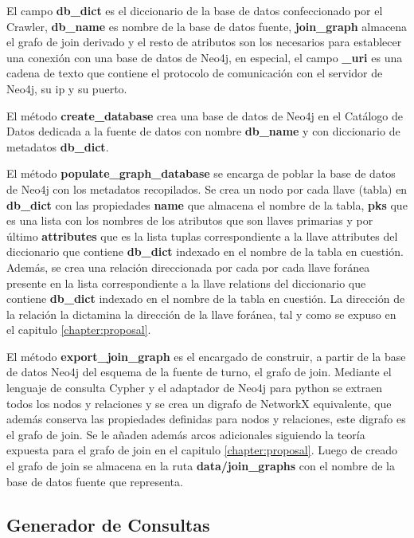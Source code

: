 El campo \textbf{db\_dict} es el diccionario de la base de datos confeccionado por el Crawler, \textbf{db\_name} es 
nombre de la base de datos fuente, \textbf{join\_graph} almacena el grafo de join derivado y el resto de atributos 
son los necesarios para establecer una conexión con una base de datos de Neo4j, en especial, el campo \textbf{\_uri} 
es una cadena de texto que contiene el protocolo de comunicación con el servidor de Neo4j, su ip y su puerto. 

El método \textbf{create\_database} crea una base de datos de Neo4j en el Catálogo de Datos dedicada a la 
fuente de datos con nombre \textbf{db\_name} y con diccionario de metadatos \textbf{db\_dict}. 

El método \textbf{populate\_graph\_database} se encarga de poblar la base de datos de Neo4j con los metadatos
recopilados. Se crea 
un nodo por cada llave (tabla) 
en \textbf{db\_dict} con las propiedades \textbf{name} que almacena el nombre de la tabla, \textbf{pks} que es una 
lista con los nombres de los atributos que son llaves primarias y por \'ultimo \textbf{attributes} que 
es la lista tuplas correspondiente a la llave attributes del diccionario que contiene \textbf{db\_dict} 
indexado en el nombre de la tabla en cuestión. Además, se crea una relación direccionada por cada por cada llave for\'anea 
presente en la lista correspondiente a la llave relations del diccionario que contiene \textbf{db\_dict} 
indexado en el nombre de la tabla en cuestión. La dirección de la relación la dictamina la dirección de la llave 
for\'anea, tal y como se expuso en el capitulo \ref{chapter:proposal}.

El método \textbf{export\_join\_graph} es el encargado de construir, a partir de la base de datos Neo4j del esquema 
de la fuente de turno, el grafo de join. Mediante el lenguaje de consulta Cypher y el adaptador de Neo4j para python 
se extraen todos los nodos y relaciones y se crea un digrafo de NetworkX equivalente, que además conserva las 
propiedades definidas para nodos y relaciones, este digrafo es el grafo de join. Se le añaden además arcos 
adicionales siguiendo la teoría expuesta para el grafo de join en el capitulo \ref{chapter:proposal}. Luego 
de creado el grafo de join se almacena en la ruta \textbf{data/join\_graphs} con el nombre de la base de datos fuente 
que representa.


\subsection{Generador de Consultas}

